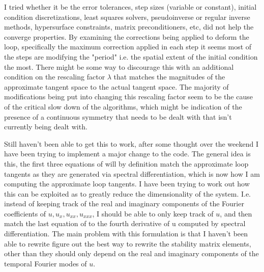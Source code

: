 I tried whether it be the error tolerances, step sizes (variable or constant), initial condition
discretizations, least squares solvers, pseudoinverse or regular inverse methods, hypersurface constraints,
matrix preconditioners, etc, did not help the converge properties.
By examining the corrections being applied to deform the loop, specifically the maximum correction applied
in each step it seems most of the steps are modifying the "period" i.e. the spatial extent of the initial
condition the most. There might be some way to discourage this with an additional condition on the
rescaling factor $\lambda$ that matches the magnitudes of the approximate tangent space to the
actual tangent space.
The majority of modifications being put into changing this rescaling factor seem to be the cause of
the critical slow down of the algorithms, which might be indication of the presence of a continuous
symmetry that needs to be dealt with that isn't currently being dealt with.

Still haven't been able to get this to work, after some thought over the weekend
I have been trying to implement a major change to the code. The general idea is this,
the first three equations of  will by definition match the approximate
loop tangents as they are generated via spectral differentiation, which is now
how I am computing the approximate loop tangents. I have been trying to work out how
this can be exploited as to greatly reduce the dimensionality of the system. I.e. instead
of keeping track of the real and imaginary components of the Fourier coefficients
of $u, u_x, u_{xx}, u_{xxx}$, I should be able to only keep track of $u$, and then match
the last equation of  to the fourth derivative of u computed by spectral
differentiation. The main problem with this formulation is that I haven't been able to
rewrite figure out the best way to rewrite the stability matrix elements, other than they
should only depend on the real and imaginary components of the temporal Fourier modes of $u$.

